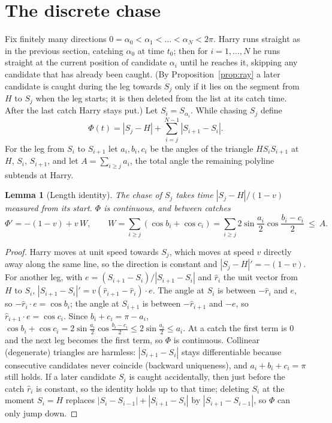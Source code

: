 \documentclass[11pt]{article}
\newtheorem{lemma}{Lemma}
\theoremstyle{remark}\newtheorem{remark}{Remark}
\newcommand{\rhat}{\hat r}
\begin{document}
\section{The discrete chase}
Fix finitely many directions $0=\alpha_0<\alpha_1<\dots<\alpha_N<2\pi$. Harry runs straight as in the previous section,
catching $\alpha_0$ at time $t_0$; then for $i=1,\dots,N$ he runs straight at the current position of candidate $\alpha_i$
until he reaches it, skipping any candidate that has already been caught. (By Proposition~\ref{prop:ray} a later candidate is
caught during the leg towards $S_j$ only if it lies on the segment from $H$ to $S_j$ when the leg starts; it is then deleted
from the list at its catch time. After the last catch Harry stays put.) Let $S_i=S_{\alpha_i}$. While chasing $S_j$ define
\[
\Phi(t)=|S_j-H|+\sum_{i=j}^{N-1}|S_{i+1}-S_i| .
\]
For the leg from $S_i$ to $S_{i+1}$ let $a_i,b_i,c_i$ be the angles of the triangle $H S_i S_{i+1}$ at $H$, $S_i$, $S_{i+1}$,
and let $A=\sum_{i\ge j}a_i$, the total angle the remaining polyline subtends at Harry.

\begin{lemma}[Length identity]\label{lem:phi}
The chase of $S_j$ takes time $|S_j-H|/(1-v)$ measured from its start. $\Phi$ is continuous, and between catches
\[
\Phi'=-(1-v)+v\,W,\qquad W=\sum_{i\ge j}(\cos b_i+\cos c_i)=\sum_{i\ge j}2\sin\frac{a_i}{2}\cos\frac{b_i-c_i}{2}\ \le\ A .
\]
\end{lemma}
\begin{proof}
Harry moves at unit speed towards $S_j$, which moves at speed $v$ directly away along the same line, so the direction is
constant and $|S_j-H|'=-(1-v)$. For another leg, with $e=(S_{i+1}-S_i)/|S_{i+1}-S_i|$ and $\rhat_i$ the unit vector from $H$
to $S_i$, $|S_{i+1}-S_i|'=v(\rhat_{i+1}-\rhat_i)\cdot e$. The angle at $S_i$ is between $-\rhat_i$ and $e$, so
$-\rhat_i\cdot e=\cos b_i$; the angle at $S_{i+1}$ is between $-\rhat_{i+1}$ and $-e$, so $\rhat_{i+1}\cdot e=\cos c_i$.
Since $b_i+c_i=\pi-a_i$, $\cos b_i+\cos c_i=2\sin\frac{a_i}{2}\cos\frac{b_i-c_i}{2}\le2\sin\frac{a_i}{2}\le a_i$.
At a catch the first term is $0$ and the next leg becomes the first term, so $\Phi$ is continuous. Collinear (degenerate)
triangles are harmless: $|S_{i+1}-S_i|$ stays differentiable because consecutive candidates never coincide (backward
uniqueness), and $a_i+b_i+c_i=\pi$ still holds. If a later candidate $S_i$ is caught accidentally, then just before the catch
$\rhat_i$ is constant, so the identity holds up to that time; deleting $S_i$ at the moment $S_i=H$ replaces
$|S_i-S_{i-1}|+|S_{i+1}-S_i|$ by $|S_{i+1}-S_{i-1}|$, so $\Phi$ can only jump down.
\end{proof}
\end{document}
